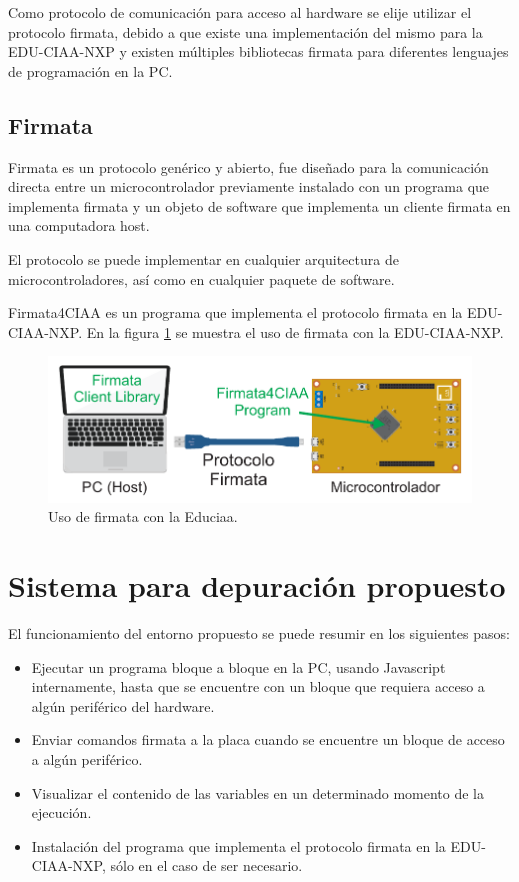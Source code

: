 Como protocolo de comunicación para acceso al hardware se elije utilizar el protocolo firmata, debido a que existe una implementación del mismo para la EDU-CIAA-NXP \citep{CIAA:firmwarev2} y existen múltiples bibliotecas firmata para diferentes lenguajes de programación en la PC.  

\subsection{Firmata}
\label{subsec:Firmata}

Firmata es un protocolo genérico y abierto, fue diseñado para la comunicación directa entre un microcontrolador previamente instalado con un programa que implementa firmata y un objeto de software que implementa un cliente firmata en una computadora host. 

El protocolo se puede implementar en cualquier arquitectura de microcontroladores, así como en cualquier paquete de software.

Firmata4CIAA es un programa que implementa el protocolo firmata en la EDU-CIAA-NXP. En la figura \ref{fig:componentesFirmata} se muestra el uso de firmata con la EDU-CIAA-NXP.

\begin{figure}[h]
	\centering
	\includegraphics[scale=.80]{./Figures/Firmata4CIAA_01.pdf}
	\caption{Uso de firmata con la Educiaa.}
	\label{fig:componentesFirmata}
\end{figure}

\section{Sistema para depuración propuesto}
\label{section:Sistema para depuración propuesto}

El funcionamiento del entorno propuesto se puede resumir en los siguientes pasos:

\begin{itemize}
	\item Ejecutar un programa bloque a bloque en la PC, usando Javascript internamente, hasta que se encuentre con un bloque que requiera acceso a algún periférico del hardware.
	\item Enviar comandos firmata a la placa cuando se encuentre un bloque de acceso a algún periférico.
	\item Visualizar el contenido de las variables en un determinado momento de la ejecución.
	\item Instalación del programa que implementa el protocolo firmata en la EDU-CIAA-NXP, sólo en el caso de ser necesario.
\end{itemize}	

